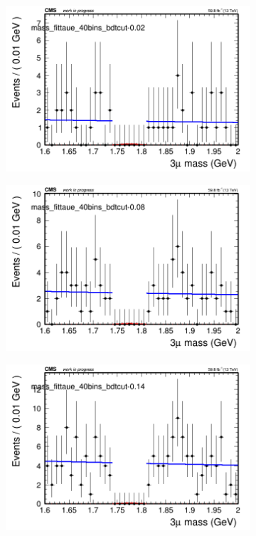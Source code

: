 \begin{figure}[H]
    \centering
    \begin{subfigure}{0.2\textwidth}
        \includegraphics[width=\textwidth]{power_law/plots/taue/massfit_taue_40bins_bdtcut-0.02.png}
        \caption{}
    \end{subfigure}
    \begin{subfigure}{0.2\textwidth}
        \includegraphics[width=\textwidth]{power_law/plots/taue/massfit_taue_40bins_bdtcut-0.08.png}
        \caption{}
    \end{subfigure}
    \begin{subfigure}{0.2\textwidth}
        \includegraphics[width=\textwidth]{power_law/plots/taue/massfit_taue_40bins_bdtcut-0.14.png}

\end{subfigure}
\end{figure}
